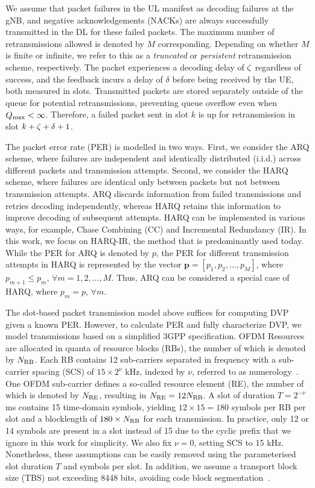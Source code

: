 We assume that packet failures in the UL manifest as decoding failures at the gNB, and negative acknowledgements (NACKs) are always successfully transmitted in the DL for these failed packets. The maximum number of retransmissions allowed is denoted by $M$ corresponding. Depending on whether $M$ is finite or infinite, we refer to this as a \textit{truncated} or \textit{persistent} retransmission scheme, respectively. 
The packet experiences a decoding delay of ${\zeta}$ regardless of success, and the feedback incurs a delay of $\delta$ before being received by the UE, both measured in slots.
Transmitted packets are stored separately outside of the queue for potential retransmissions, preventing queue overflow even when $Q_{\mathrm{max}} < \infty$. Therefore, a failed packet sent in slot $k$ is up for retransmission in slot $k + {\zeta} + \delta + 1$.

The packet error rate (PER) is modelled in two ways. First, we consider the ARQ scheme, where failures are independent and identically distributed (i.i.d.) across different packets and transmission attempts. Second, we consider the HARQ scheme, where failures are identical only between packets but not between transmission attempts. ARQ discards information from failed transmissions and retries decoding independently, whereas HARQ retains this information to improve decoding of subsequent attempts. HARQ can be implemented in various ways, for example, Chase Combining (CC) and Incremental Redundancy (IR)\cite{DAHLMAN2014299}. In this work, we focus on HARQ-IR, the method that is predominantly used today. While the PER for ARQ is denoted by $p$, the PER for different transmission attempts in HARQ is represented by the vector $\bm{p} = [p_1, p_2, \dots, p_M]$, where $p_{m+1} \leq p_m,\,\forall m= 1, 2, \dots, M$. Thus, ARQ can be considered a special case of HARQ, where $p_m = p,\,\forall m$.

The slot-based packet transmission model above suffices for computing DVP given a known PER. However, to calculate PER and fully characterize DVP, we model transmissions based on a simplified 3GPP specification.
OFDM Resources are allocated in quanta of resource blocks (RBs), the number of which is denoted by $N_{\mathrm{RB}}$. 
Each RB contains 12 sub-carriers separated in frequency with a sub-carrier spacing (SCS) of $15 \times 2^\nu$ kHz, indexed by $\nu$, referred to as numerology~\cite{3gpp.38.211}.
One OFDM sub-carrier defines a so-called resource element (RE), the number of which is denoted by $N_{\mathrm{RE}}$, resulting in $N_{\mathrm{RE}} = 12N_{\mathrm{RB}}$.
A slot of duration $T = 2^{-\nu}$ ms contains 15 time-domain symbols, yielding $12\times15 = 180$ symbols per RB per slot and a blocklength of $180\times N_{\mathrm{RB}}$ for each transmission.
In practice, only 12 or 14 symbols are present in a slot instead of 15 due to the cyclic prefix that we ignore in this work for simplicity. We also fix $\nu = 0$, setting SCS to 15 kHz. Nonetheless, these assumptions can be easily removed using the parameterised slot duration $T$ and symbols per slot. In addition, we assume a transport block size (TBS) not exceeding 8448 bits, avoiding code block segmentation~\cite{3gpp.38.212}.

